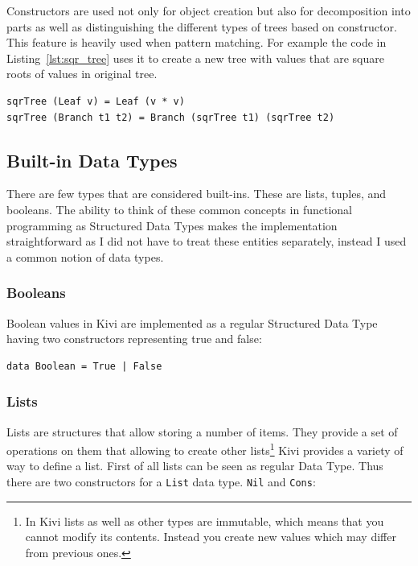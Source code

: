 \documentclass[12pt,a4paper]{report}
\begin{document}
Constructors are used not only for object creation but also for decomposition
into parts as well as distinguishing the different types of trees based on
constructor. This feature is heavily used when pattern matching. For example
the code in Listing~\ref{lst:sqr_tree} uses it to create a new tree with values
that are square roots of values in original tree.

\vspace*{0.2in}
\begin{lstlisting}[label=lst:sqr_tree,caption={Creating a `square rooted` tree.}]
sqrTree (Leaf v) = Leaf (v * v)
sqrTree (Branch t1 t2) = Branch (sqrTree t1) (sqrTree t2)
\end{lstlisting}

\subsection{Built-in Data Types}
There are few types that are considered built-ins. These are lists, tuples,
and booleans. The ability to think of these common concepts in functional
programming as Structured Data Types makes the implementation straightforward
as I did not have to treat these entities separately, instead I used a common
notion of data types.
\subsubsection{Booleans}
Boolean values in Kivi are implemented as a regular Structured Data Type having
two constructors representing true and false:

\vspace*{0.2in}
\begin{lstlisting}[style=haskell]
data Boolean = True | False
\end{lstlisting}

\subsubsection{Lists}
Lists are structures that allow storing a number of items. They
provide a set of operations on them that allowing to create other
lists\footnote{In Kivi lists as well as other types are immutable, which means
that you cannot modify its contents. Instead you create new values which may
differ from previous ones. }
Kivi provides a variety of way to define a list. First of all lists can be seen
as regular Data Type. Thus there are two constructors for a \texttt{List}
data type. \texttt{Nil} and \texttt{Cons}:
\end{document}
